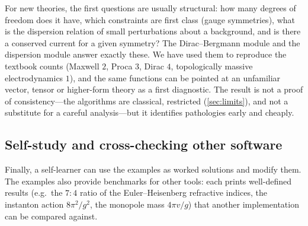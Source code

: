 For new theories, the first questions are usually structural: how many degrees of freedom does it have, which constraints are first class (gauge symmetries), what is the dispersion relation of small perturbations about a background, and is there a conserved current for a given symmetry? The Dirac--Bergmann module and the dispersion module answer exactly these. We have used them to reproduce the textbook counts (Maxwell $2$, Proca $3$, Dirac $4$, topologically massive electrodynamics $1$), and the same functions can be pointed at an unfamiliar vector, tensor or higher-form theory as a first diagnostic. The result is not a proof of consistency---the algorithms are classical, restricted (\cref{sec:limits}), and not a substitute for a careful analysis---but it identifies pathologies early and cheaply.

\subsection{Self-study and cross-checking other software}

Finally, a self-learner can use the examples as worked solutions and modify them. The examples also provide benchmarks for other tools: each prints well-defined results (e.g.\ the $7{:}4$ ratio of the Euler--Heisenberg refractive indices, the instanton action $8\pi^2/g^2$, the monopole mass $4\pi v/g$) that another implementation can be compared against.
